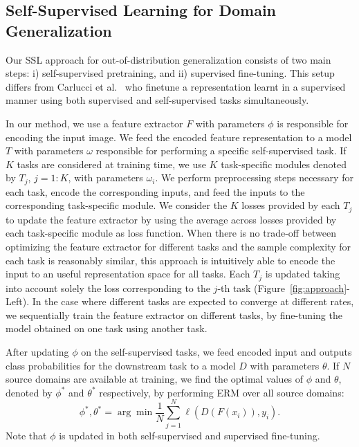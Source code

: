 \documentclass[runningheads]{llncs}
\begin{document}
\subsection{Self-Supervised Learning for Domain Generalization}
Our SSL approach for out-of-distribution generalization consists of two main steps: i) self-supervised pretraining, and ii) supervised fine-tuning. This setup differs from Carlucci et al.~\cite{carlucci2019domain} who finetune a representation learnt in a supervised manner using both supervised and self-supervised tasks simultaneously.

In our method, we use a feature extractor $F$ with parameters $\phi$ is responsible for encoding the input image. We feed the encoded feature representation to a model $T$ with parameters $\omega$ responsible for performing a specific self-supervised task. If $K$ tasks are considered at training time, we use $K$ task-specific modules denoted by $T_j$, $j=1:K$, with parameters $\omega_i$.  We perform preprocessing steps necessary for each task, encode the corresponding inputs, and feed the inputs to the corresponding task-specific module. We consider the $K$ losses provided by each $T_j$ to update the feature extractor by using the average across losses provided by each task-specific module as loss function. When there is no trade-off between optimizing the feature extractor for different tasks and the sample complexity for each task is reasonably similar, this approach is intuitively able to encode the input to an useful representation space for all tasks. Each $T_j$ is updated taking into account solely the loss corresponding to the $j$-th task (Figure~\ref{fig:approach}-Left). In the case where different tasks are expected to converge at different rates, we sequentially train the feature extractor on different tasks, by fine-tuning the model obtained on one task using another task. 



After updating $\phi$ on the self-supervised tasks, we feed encoded input and outputs class probabilities for the downstream task to a model $D$ with parameters $\theta$. If $N$ source domains are available at training, we find the optimal values of $\phi$ and $\theta$, denoted by $\phi^*$ and $\theta^*$ respectively, by performing ERM over all source domains:\vspace{-5pt}
\begin{equation}\label{ERM}
    \phi^*, \theta^* = \arg \min \frac{1}{N} \sum_{j=1}^{N} \ell(D(F(x_i)),y_i).
\end{equation}
Note that $\phi$ is updated in both self-supervised and supervised fine-tuning. 
\end{document}
